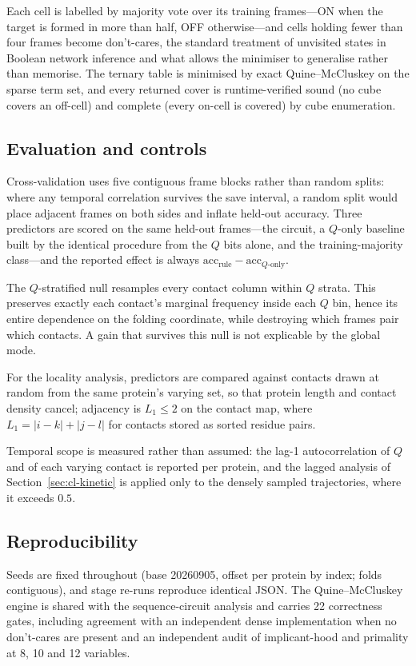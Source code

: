 Each cell is labelled by majority vote over its training frames---ON when the
target is formed in more than half, OFF otherwise---and cells holding fewer
than four frames become don't-cares, the standard treatment of unvisited states
in Boolean network inference and what allows the minimiser to generalise rather
than memorise.  The ternary table is minimised by exact Quine--McCluskey on the
sparse term set, and every returned cover is runtime-verified sound (no cube
covers an off-cell) and complete (every on-cell is covered) by cube
enumeration.

\subsection{Evaluation and controls}
Cross-validation uses five contiguous frame blocks rather than random splits:
where any temporal correlation survives the save interval, a random split would
place adjacent frames on both sides and inflate held-out accuracy.  Three
predictors are scored on the same held-out frames---the circuit, a $Q$-only
baseline built by the identical procedure from the $Q$ bits alone, and the
training-majority class---and the reported effect is always
$\mathrm{acc}_{\mathrm{rule}} - \mathrm{acc}_{Q\text{-only}}$.

The $Q$-stratified null resamples every contact column within $Q$ strata.  This
preserves exactly each contact's marginal frequency inside each $Q$ bin, hence
its entire dependence on the folding coordinate, while destroying which frames
pair which contacts.  A gain that survives this null is not explicable by the
global mode.

For the locality analysis, predictors are compared against contacts drawn at
random from the same protein's varying set, so that protein length and contact
density cancel; adjacency is $L_1 \leq 2$ on the contact map, where
$L_1 = |i-k| + |j-l|$ for contacts stored as sorted residue pairs.

Temporal scope is measured rather than assumed: the lag-1 autocorrelation of
$Q$ and of each varying contact is reported per protein, and the lagged
analysis of Section~\ref{sec:cl-kinetic} is applied only to the densely sampled
trajectories, where it exceeds $0.5$.

\subsection{Reproducibility}
Seeds are fixed throughout (base 20260905, offset per protein by index; folds
contiguous), and stage re-runs reproduce identical JSON.  The
Quine--McCluskey engine is shared with the sequence-circuit analysis and
carries 22 correctness gates, including agreement with an independent dense
implementation when no don't-cares are present and an independent audit of
implicant-hood and primality at 8, 10 and 12 variables.

